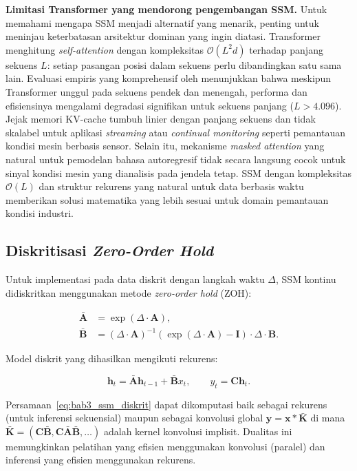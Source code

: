 \textbf{Limitasi Transformer yang mendorong pengembangan SSM.} Untuk memahami
mengapa SSM menjadi alternatif yang menarik, penting untuk meninjau keterbatasan
arsitektur dominan yang ingin diatasi. Transformer 
menghitung \emph{self-attention} dengan kompleksitas $\mathcal{O}(L^2 d)$
terhadap panjang sekuens $L$: setiap pasangan posisi dalam sekuens perlu
dibandingkan satu sama lain. Evaluasi empiris yang komprehensif oleh
 menunjukkan bahwa meskipun Transformer unggul pada
sekuens pendek dan menengah, performa dan efisiensinya mengalami degradasi
signifikan untuk sekuens panjang ($L > 4.096$). Jejak memori KV-cache tumbuh
linier dengan panjang sekuens dan tidak skalabel untuk aplikasi \emph{streaming}
atau \emph{continual monitoring} seperti pemantauan kondisi mesin berbasis sensor.
Selain itu, mekanisme \emph{masked attention} yang natural untuk pemodelan bahasa
autoregresif tidak secara langsung cocok untuk sinyal kondisi mesin yang dianalisis
pada jendela tetap. SSM dengan kompleksitas $\mathcal{O}(L)$ dan struktur rekurens
yang natural untuk data berbasis waktu memberikan solusi matematika yang lebih
sesuai untuk domain pemantauan kondisi industri.

\subsection{Diskritisasi \emph{Zero-Order Hold}}
\label{subsec:bab3_zoh}

Untuk implementasi pada data diskrit dengan langkah waktu $\Delta$, SSM
kontinu didiskritkan menggunakan metode \emph{zero-order hold} (ZOH):

\begin{align}
  \bar{\mathbf{A}} &= \exp(\Delta \cdot \mathbf{A}),
    \label{eq:bab3_zoh_A} \\
  \bar{\mathbf{B}} &= (\Delta \cdot \mathbf{A})^{-1}
    (\exp(\Delta \cdot \mathbf{A}) - \mathbf{I}) \cdot \Delta \cdot \mathbf{B}.
    \label{eq:bab3_zoh_B}
\end{align}

Model diskrit yang dihasilkan mengikuti rekurens:

\begin{equation}\label{eq:bab3_ssm_diskrit}
  \mathbf{h}_t = \bar{\mathbf{A}} \mathbf{h}_{t-1} + \bar{\mathbf{B}} x_t,
  \qquad y_t = \mathbf{C} \mathbf{h}_t.
\end{equation}

Persamaan~\ref{eq:bab3_ssm_diskrit} dapat dikomputasi baik sebagai rekurens
(untuk inferensi sekuensial) maupun sebagai konvolusi global
$\mathbf{y} = \mathbf{x} * \bar{\mathbf{K}}$ di mana
$\bar{\mathbf{K}} = (\mathbf{C}\bar{\mathbf{B}},
\mathbf{C}\bar{\mathbf{A}}\bar{\mathbf{B}}, \ldots)$ adalah kernel konvolusi
implisit. Dualitas ini memungkinkan pelatihan yang efisien menggunakan konvolusi
(paralel) dan inferensi yang efisien menggunakan rekurens.

